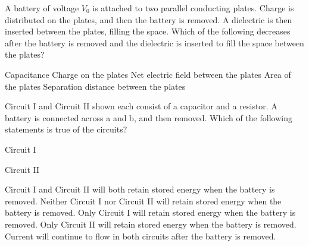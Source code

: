 \documentclass{../../../oss-classkick-exam}
\begin{document}
\begin{multicols*}{2}
\begin{questions}
    \question A battery of voltage $V_0$ is attached to two parallel conducting
    plates. Charge is distributed on the plates, and then the battery is
    removed. A dielectric is then inserted between the plates, filling the
    space. Which of the following decreases after the battery is removed and the
    dielectric is inserted to fill the space between the plates?
    \begin{choices}
      \choice Capacitance
      \choice Charge on the plates
      \choice Net electric field between the plates
      \choice Area of the plates
      \choice Separation distance between the plates
    \end{choices}
    \vspace{.7in}
    \columnbreak
    
    \question Circuit I and Circuit II shown each consist of a capacitor and a
    resistor. A battery is connected across a and b, and then removed. Which of
    the following statements is true of the circuits?

    \vspace{-.2in}
    \begin{center}
      Circuit I\\
      
      Circuit II\\
    \end{center}
    \begin{choices}
      \choice Circuit I and Circuit II will both retain stored energy when the
      battery is removed.
      \choice Neither Circuit I nor Circuit II will retain stored energy when
      the battery is removed.
      \choice Only Circuit I will retain stored energy when the battery is
      removed.
      \choice Only Circuit II will retain stored energy when the battery is
      removed.
      \choice Current will continue to flow in both circuits after the battery
      is removed.
    \end{choices}


\end{questions}
\end{multicols*}
\end{document}
